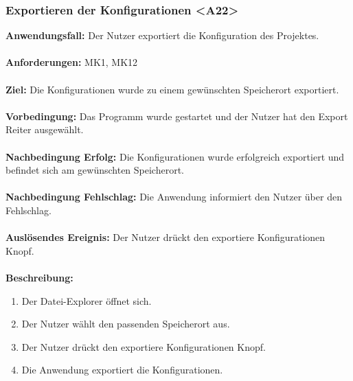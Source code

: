 \documentclass[parskip=full]{scrartcl} %
\begin{document}
\subsubsection*{Exportieren der Konfigurationen <A22>}
\textbf{Anwendungsfall:} Der Nutzer exportiert die Konfiguration des Projektes.\\\\
\textbf{Anforderungen:} MK1, MK12\\\\
\textbf{Ziel:} Die Konfigurationen wurde zu einem gewünschten Speicherort exportiert.\\\\
\textbf{Vorbedingung:} Das Programm wurde gestartet und der Nutzer hat den Export Reiter ausgewählt.\\\\
\textbf{Nachbedingung Erfolg:} Die Konfigurationen wurde erfolgreich exportiert und befindet sich am gewünschten Speicherort.\\\\
\textbf{Nachbedingung Fehlschlag:}  Die Anwendung informiert den Nutzer über den Fehlschlag.\\\\
\textbf{Auslösendes Ereignis:} Der Nutzer drückt den exportiere Konfigurationen Knopf. \\\\
\textbf{Beschreibung:}
\begin{enumerate}
    \item Der Datei-Explorer öffnet sich.
    \item Der Nutzer wählt den passenden Speicherort aus.
    \item Der Nutzer drückt den exportiere Konfigurationen Knopf.
    \item Die Anwendung exportiert die Konfigurationen.
\end{enumerate}
\newpage
\end{document}
